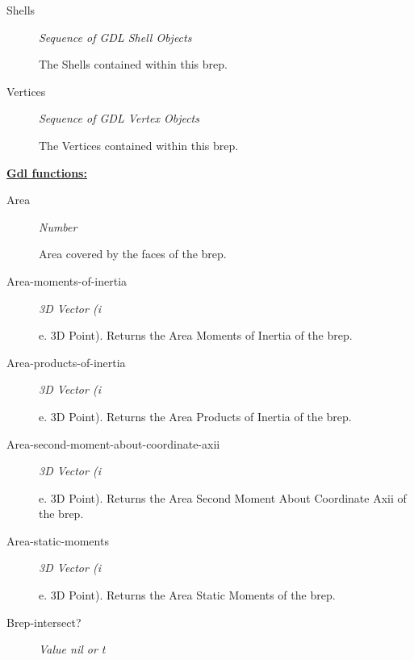 \documentclass [11pt]{book}
\begin{document}
\begin{itemize}
\begin{description}
\item [Shells]
\emph{Sequence of GDL Shell Objects}

 The Shells contained within this brep.




\item [Vertices]
\emph{Sequence of GDL Vertex Objects}

 The Vertices contained within this brep.




\end{description}






\textbf{
\underline{Gdl functions:}}

\begin{description}

\item [Area]
\emph{Number}

 Area covered by the faces of the brep.




\item [Area-moments-of-inertia]
\emph{3D Vector (i}

e. 3D Point). Returns the Area Moments of Inertia of the brep.




\item [Area-products-of-inertia]
\emph{3D Vector (i}

e. 3D Point). Returns the Area Products of Inertia of the brep.




\item [Area-second-moment-about-coordinate-axii]
\emph{3D Vector (i}

e. 3D Point). Returns the Area Second Moment About Coordinate Axii of the brep.




\item [Area-static-moments]
\emph{3D Vector (i}

e. 3D Point). Returns the Area Static Moments of the brep.




\item [Brep-intersect?]
\emph{Value nil or t}


\end{description}
\end{itemize}
\end{document}
